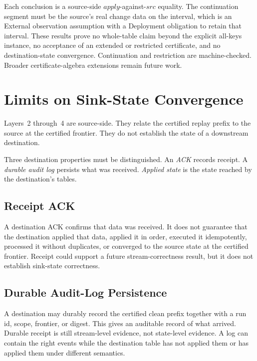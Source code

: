 \documentclass[letterpaper,10pt,twocolumn]{article}
\newcommand{\Apply}{\mathit{apply}}
\newcommand{\Src}{\mathit{src}}
\begin{document}
Each conclusion is a source-side $\Apply$-against-$\Src$ equality. The
continuation segment must be the source's real change data
on the interval, which is an External observation assumption with a
Deployment obligation to retain that interval. These results prove no
whole-table claim beyond the explicit all-keys instance, no acceptance of an
extended or restricted certificate, and no destination-state
convergence. Continuation and restriction are machine-checked. Broader
certificate-algebra extensions remain future work.

\section{Limits on Sink-State Convergence}\label{sink-state-convergence-non-claim}

Layers~2 through~4 are source-side. They relate the certified replay
prefix to the source at the certified frontier. They do not establish
the state of a downstream destination.

Three destination properties must be distinguished. An \emph{ACK}
records receipt. A \emph{durable audit log} persists what was received.
\emph{Applied state} is the state reached by the destination's tables.

\subsection{Receipt ACK}\label{receipt-ack}

A destination ACK confirms that data was received. It does not
guarantee that the destination applied that data, applied it in order,
executed it idempotently, processed it without duplicates, or converged
to the source state at the certified frontier. Receipt could support a
future stream-correctness result, but it does not establish sink-state
correctness.

\subsection{Durable Audit-Log
Persistence}\label{durable-audit-log-persistence}

A destination may durably record the certified clean prefix together
with a run id, scope, frontier, or digest. This gives an auditable record
of what arrived. Durable receipt is still
stream-level evidence, not state-level evidence. A log can contain the
right events while the destination table has not applied them or has
applied them under different semantics.
\end{document}
